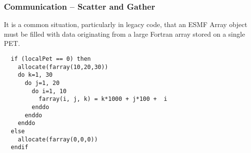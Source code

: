  
\setlength{\oldparskip}{\parskip}
\setlength{\parskip}{1.5ex}
\setlength{\oldparindent}{\parindent}
\setlength{\parindent}{0pt}
\setlength{\oldbaselineskip}{\baselineskip}
\setlength{\baselineskip}{11pt}
 
\def\bv{\begin{verbatim}}
\def\ev{\end{verbatim}}
\def\be{\begin{equation}}
\def\ee{\end{equation}}
\def\bea{\begin{eqnarray}}
\def\eea{\end{eqnarray}}
\def\bi{\begin{itemize}}
\def\ei{\end{itemize}}
\def\bn{\begin{enumerate}}
\def\en{\end{enumerate}}
\def\bd{\begin{description}}
\def\ed{\end{description}}
\def\({\left (}
\def\){\right )}
\def\[{\left [}
\def\]{\right ]}
\def\<{\left  \langle}
\def\>{\right \rangle}
\def\cI{{\cal I}}
\def\diag{\mathop{\rm diag}}
\def\tr{\mathop{\rm tr}}


 

  
   \subsubsection{Communication -- Scatter and Gather}
   \label{Array:ScatterGather}
   
   It is a common situation, particularly in legacy code, that an ESMF Array
   object must be filled with data originating from a large Fortran array stored
   on a single PET. 

 \begin{verbatim}
  if (localPet == 0) then
    allocate(farray(10,20,30))
    do k=1, 30
      do j=1, 20
        do i=1, 10
          farray(i, j, k) = k*1000 + j*100 +  i
        enddo
      enddo
    enddo
  else
    allocate(farray(0,0,0))
  endif
 
\end{verbatim}
 
